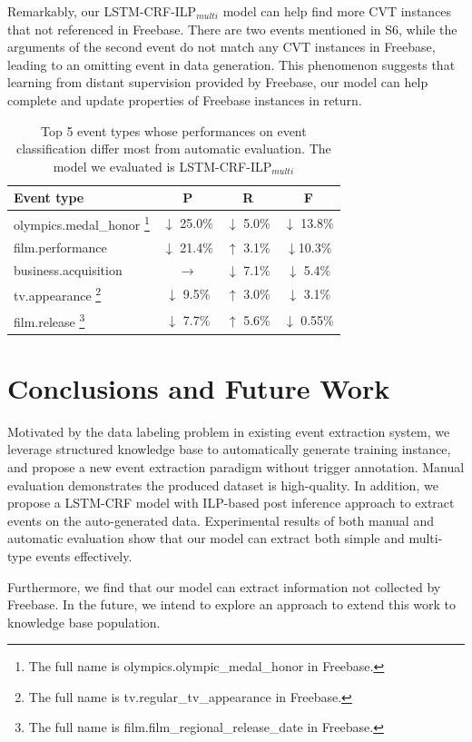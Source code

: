 \documentclass{article}
\begin{document}
Remarkably, our LSTM-CRF-ILP$_{multi}$ model can help find more CVT instances that not referenced in Freebase. There are two events mentioned in S6, while the arguments of the second event do not match any CVT instances in Freebase, leading to an omitting event in data generation. This phenomenon suggests that learning from distant supervision provided by Freebase, our model can help complete and update properties of Freebase instances in return.

\begin{table}[h]
\small
\centering
\begin{tabular}{|l|c|c|c|} \hline
	Event type & P & R & F \\ \hline
	olympics.medal\_honor 
	 \footnote{The full name is olympics.olympic\_medal\_honor in Freebase.} 
	& $\downarrow$ 25.0\% & $\downarrow$ 5.0\% & $\downarrow$ 13.8\% \\ \hline
	film.performance & $\downarrow$ 21.4\% & $\uparrow$ 3.1\% & $\downarrow$10.3\% \\ \hline
	business.acquisition & $\rightarrow$ & $\downarrow$ 7.1\% & $\downarrow$ 5.4\% \\ \hline
	tv.appearance 
	 \footnote{The full name is tv.regular\_tv\_appearance in Freebase.} 
	& $\downarrow$ 9.5\% & $\uparrow$ 3.0\% & $\downarrow$ 3.1\% \\ \hline
	film.release 
	 \footnote{The full name is film.film\_regional\_release\_date in Freebase.} 
	& $\downarrow$ 7.7\% & $\uparrow$ 5.6\% & $\downarrow$ 0.55\% \\ \hline
\end{tabular}
\caption{Top 5 event types whose performances on event classification differ most from automatic evaluation. The model we evaluated is LSTM-CRF-ILP$_{multi}$ \label{tab:4}}
\end{table}



\section{Conclusions and Future Work}
Motivated by the data labeling problem in existing event extraction system, we leverage structured knowledge base to automatically generate training instance, and propose a new event extraction paradigm without trigger annotation. Manual evaluation  demonstrates the produced dataset is high-quality. In addition, we propose a LSTM-CRF model with ILP-based post inference approach to extract events on the auto-generated data. Experimental results of both manual and automatic evaluation show that our model can extract both simple and multi-type events effectively.

Furthermore, we find that our model can extract information not collected by Freebase. In the future, we intend to explore an approach to extend this work to knowledge base population. 




\end{document}

